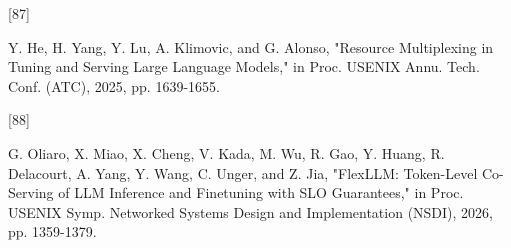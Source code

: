 \hypertarget{ref:87}{[87]} Y. He, H. Yang, Y. Lu, A. Klimovic, and G. Alonso, "Resource Multiplexing in Tuning and Serving Large Language Models," in Proc. USENIX Annu. Tech. Conf. (ATC), 2025, pp. 1639-1655.

\hypertarget{ref:88}{[88]} G. Oliaro, X. Miao, X. Cheng, V. Kada, M. Wu, R. Gao, Y. Huang, R. Delacourt, A. Yang, Y. Wang, C. Unger, and Z. Jia, "FlexLLM: Token-Level Co-Serving of LLM Inference and Finetuning with SLO Guarantees," in Proc. USENIX Symp. Networked Systems Design and Implementation (NSDI), 2026, pp. 1359-1379.

